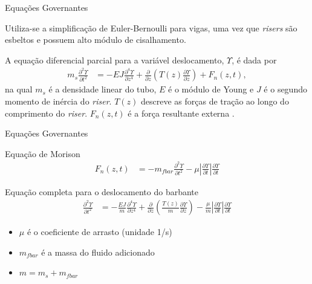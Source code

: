 \documentclass[10pt]{beamer}
\begin{document}
\begin{frame}[fragile]{Equações Governantes}

\begin{block}{}
Utiliza-se a simplificação de Euler-Bernoulli para vigas, uma vez que \textit{risers} são esbeltos e possuem alto módulo de cisalhamento.
\end{block}

\begin{block}{}
A equação diferencial parcial para a variável deslocamento, $\Upsilon$, é dada por \begin{align}
	m_s \frac{\partial^2 \Upsilon}{\partial t^2} &= -E J	\frac{\partial^4 \Upsilon}{\partial z^4} + \frac{\partial}{\partial z}\left(T(z) \frac{\partial \Upsilon}{\partial z}\right) + F_n(z,t),
\end{align} na qual $m_s$ é a densidade linear do tubo, $E$ é o módulo de Young e $J$ é o segundo momento de inércia do \textit{riser}. $T(z)$ descreve as forças de tração ao longo do comprimento do \textit{riser}. $F_n(z,t)$ é a força resultante externa \cite{fabricioIFAC}.
\end{block}

\end{frame}

\begin{frame}[fragile]{Equações Governantes}
\begin{block}{Equação de Morison}
\begin{align}
	F_n(z,t) &= -m_{fbar} \frac{\partial^2 \Upsilon}{\partial t^2} - \mu \left|\frac{\partial \Upsilon}{\partial t}\right|\frac{\partial \Upsilon}{\partial t}\label{forceN}
\end{align}
\end{block}
\begin{block}{Equação completa para o deslocamento do barbante}
\begin{align}
	\frac{\partial^2 \Upsilon}{\partial t^2} &= -\frac{EJ}{m}\frac{\partial^4 \Upsilon}{\partial z^4} + \frac{\partial}{\partial z}\left(\frac{T(z)}{m}\frac{\partial \Upsilon}{\partial z}\right) - \frac{\mu}{m}\left|\frac{\partial \Upsilon}{\partial t}\right|\frac{\partial \Upsilon}{\partial t}\label{equacaoBarbante}
	\end{align}
\end{block}
\begin{block}{}
\begin{itemize}
	\item $\mu$ é o coeficiente de arrasto (unidade 1/s) 
	\item $m_{fbar}$ é a massa do fluido adicionado
	\item $m = m_s + m_{fbar}$
\end{itemize}	
\end{block}
\end{frame}
\end{document}
